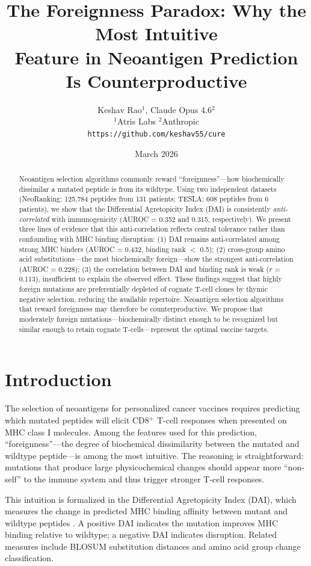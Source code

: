 \documentclass[11pt,twocolumn]{article}
\title{\textbf{The Foreignness Paradox: Why the Most Intuitive\\Feature in Neoantigen Prediction Is Counterproductive}}
\author{Keshav Rao$^{1}$, Claude Opus 4.6$^{2}$ \\[4pt]
\small $^{1}$Atris Labs \quad $^{2}$Anthropic \\[2pt]
\small \texttt{https://github.com/keshav55/cure}}
\date{March 2026}
\begin{document}
\maketitle

\begin{abstract}
Neoantigen selection algorithms commonly reward ``foreignness''---how biochemically dissimilar a mutated peptide is from its wildtype. Using two independent datasets (NeoRanking: 125,784 peptides from 131 patients; TESLA: 608 peptides from 6 patients), we show that the Differential Agretopicity Index (DAI) is consistently \textit{anti-correlated} with immunogenicity (AUROC = 0.352 and 0.315, respectively). We present three lines of evidence that this anti-correlation reflects central tolerance rather than confounding with MHC binding disruption: (1) DAI remains anti-correlated among strong MHC binders (AUROC = 0.432, binding rank $<$ 0.5); (2) cross-group amino acid substitutions---the most biochemically foreign---show the strongest anti-correlation (AUROC = 0.228); (3) the correlation between DAI and binding rank is weak ($r$ = 0.113), insufficient to explain the observed effect. These findings suggest that highly foreign mutations are preferentially depleted of cognate T-cell clones by thymic negative selection, reducing the available repertoire. Neoantigen selection algorithms that reward foreignness may therefore be counterproductive. We propose that moderately foreign mutations---biochemically distinct enough to be recognized but similar enough to retain cognate T-cells---represent the optimal vaccine targets.
\end{abstract}

\section{Introduction}

The selection of neoantigens for personalized cancer vaccines requires predicting which mutated peptides will elicit CD8$^{+}$ T-cell responses when presented on MHC class I molecules. Among the features used for this prediction, ``foreignness''---the degree of biochemical dissimilarity between the mutated and wildtype peptide---is among the most intuitive. The reasoning is straightforward: mutations that produce large physicochemical changes should appear more ``non-self'' to the immune system and thus trigger stronger T-cell responses.

This intuition is formalized in the Differential Agretopicity Index (DAI), which measures the change in predicted MHC binding affinity between mutant and wildtype peptides \cite{wells2020tesla}. A positive DAI indicates the mutation improves MHC binding relative to wildtype; a negative DAI indicates disruption. Related measures include BLOSUM substitution distances and amino acid group change classification.
\end{document}
